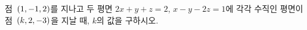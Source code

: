 점~$(1{,}\mkern3mu\mathopen{}-1{,}\mkern3mu\mathopen{}2)$를 지나고 두 평면 $2x+y+z=2$, $x-y-2z=1$에 각각 수직인 평면이 점~$(k{,}\mkern3mu\mathopen{}2{,}\mkern3mu\mathopen{}-3)$을 지날 때, $k$의 값을 구하시오.
